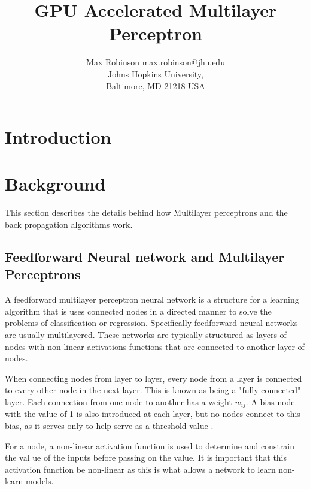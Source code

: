 \documentclass[jair, twoside,11pt,theapa]{article}
\begin{document}
\title{GPU Accelerated Multilayer Perceptron}
\author{\name Max Robinson \email max.robinson@jhu.edu \\
       \addr Johns Hopkins University,\\
       Baltimore, MD 21218 USA
}

\maketitle


\section{Introduction}
\label{Introduction}

\section{Background}
\label{Background}
This section describes the details behind how Multilayer perceptrons and the back propagation algorithms work. 

\subsection{Feedforward Neural network and Multilayer Perceptrons}
A feedforward multilayer perceptron neural network is a structure for a learning algorithm that is uses connected nodes in a directed manner to solve the problems of classification or regression. 
Specifically feedforward neural networks are usually multilayered. 
These networks are typically structured as layers of nodes with non-linear activations functions that are connected to another layer of nodes. 

When connecting nodes from layer to layer, every node from a layer is connected to every other node in the next layer.
This is known as being a "fully connected" layer.  
Each connection from one node to another has a weight $w_{ij}$. 
A bias node with the value of 1 is also introduced at each layer, but no nodes connect to this bias, as it serves only to help serve as a threshold value \cite{BackProp}.


For a node, a non-linear activation function is used to determine and constrain the val ue of the inputs before passing on the value. 
It is important that this activation function be non-linear as this is what allows a network to learn non-learn models. 
\end{document}
